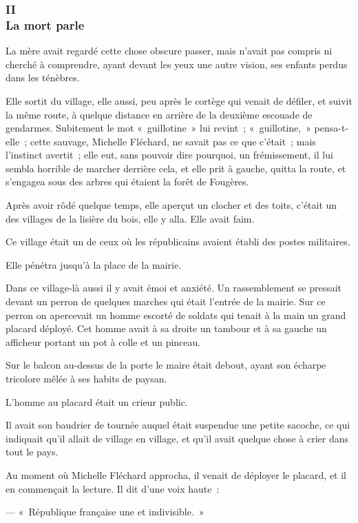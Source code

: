 \documentclass[french,twoside]{book} %
\begin{document}
 \subsubsection[{II. La mort parle}]{II \\
La mort parle}
\label{p3l4c2}
\noindent La mère avait regardé cette chose obscure passer, mais n’avait pas compris ni cherché à comprendre, ayant devant les yeux une autre vision, ses enfants perdus dans les ténèbres.\par
Elle sortit du village, elle aussi, peu après le cortège qui venait de défiler, et suivit la même route, à quelque distance en arrière de la deuxième escouade de gendarmes. Subitement le mot « guillotine » lui revint ; « guillotine, » pensa-t-elle ; cette sauvage, Michelle Fléchard, ne savait pas ce que c’était ; mais l’instinct avertit ; elle eut, sans pouvoir dire pourquoi, un frémissement, il lui sembla horrible de marcher derrière cela, et elle prit à gauche, quitta la route, et s’engagea sous des arbres qui étaient la forêt de Fougères.\par
Après avoir rôdé quelque temps, elle aperçut un clocher et des toits, c’était un des villages de la lisière du bois, elle y alla. Elle avait faim.\par
Ce village était un de ceux où les républicains avaient établi des postes militaires.\par
Elle pénétra jusqu’à la place de la mairie.\par
 Dans ce village-là aussi il y avait émoi et anxiété. Un rassemblement se pressait devant un perron de quelques marches qui était l’entrée de la mairie. Sur ce perron on apercevait un homme escorté de soldats qui tenait à la main un grand placard déployé. Cet homme avait à sa droite un tambour et à sa gauche un afficheur portant un pot à colle et un pinceau.\par
Sur le balcon au-dessus de la porte le maire était debout, ayant son écharpe tricolore mêlée à ses habits de paysan.\par
L’homme au placard était un crieur public.\par
Il avait son baudrier de tournée auquel était suspendue une petite sacoche, ce qui indiquait qu’il allait de village en village, et qu’il avait quelque chose à crier dans tout le pays.\par
Au moment où Michelle Fléchard approcha, il venait de déployer le placard, et il en commençait la lecture. Il dit d’une voix haute :\par
— « République française une et indivisible. »\par
\end{document}
